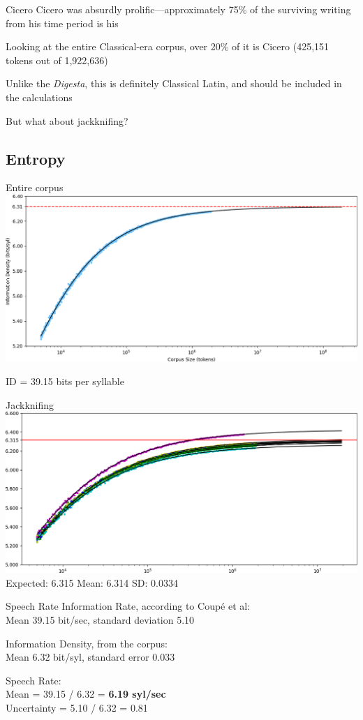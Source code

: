 \documentclass{beamer}
\begin{document}
\begin{frame}{Cicero}
Cicero was absurdly prolific---approximately 75\% of the surviving writing from his time period is his

Looking at the entire Classical-era corpus, over 20\% of it is Cicero (425,151 tokens out of 1,922,636)

Unlike the \emph{Digesta}, this is definitely Classical Latin, and should be included in the calculations

But what about jackknifing?
\end{frame}

\subsection{Entropy}

\begin{frame}{Entire corpus}
\includegraphics[width=\linewidth]{demo3}

ID = 39.15 bits per syllable
\end{frame}

\begin{frame}{Jackknifing}
\includegraphics[width=\linewidth]{jk_cicero}
Expected: 6.315 Mean: 6.314 SD: 0.0334
\end{frame}

\begin{frame}{Speech Rate}
Information Rate, according to Coupé et al:\\
\quad Mean 39.15 bit/sec, standard deviation 5.10

Information Density, from the corpus:\\
\quad Mean 6.32 bit/syl, standard error 0.033

Speech Rate:\\
Mean = 39.15 / 6.32 = \textbf{6.19 syl/sec} \\
\quad Uncertainty = 5.10 / 6.32 = 0.81
\end{frame}
\end{document}
